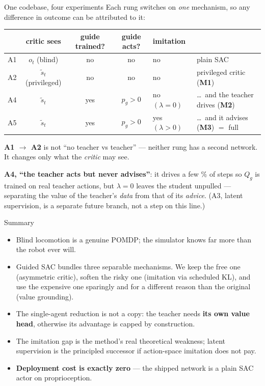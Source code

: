\documentclass[aspectratio=169]{beamer}
\newcommand{\ot}{o_t}
\newcommand{\st}{\tilde{s}_t}
\begin{document}
\begin{frame}{One codebase, four experiments}
  \relax
  {\footnotesize Each rung switches on \emph{one} mechanism, so any difference in outcome can be
  attributed to it:}
  \vspace{0.3em}
  \begin{center}\scriptsize
  \begin{tabular}{lcccll}
    \toprule
    & \textbf{critic sees} & \textbf{guide trained?} & \textbf{guide acts?} & \textbf{imitation} & \\
    \midrule
    A1 & $\ot$ (blind)      & no  & no        & no             & plain SAC \\
    A2 & $\st$ (privileged) & no  & no        & no             & privileged critic (\textbf{M1}) \\
    A4 & $\st$              & yes & $p_g > 0$ & no $(\lambda=0)$ & \ldots\ and the teacher drives (\textbf{M2}) \\
    A5 & $\st$              & yes & $p_g > 0$ & yes $(\lambda>0)$ & \ldots\ and it advises (\textbf{M3}) $=$ full \\
    \bottomrule
  \end{tabular}
  \end{center}
  \vspace{0.5em}
  {\footnotesize \textbf{A1 $\to$ A2} is not ``no teacher vs teacher'' --- neither rung has a
  second network. It changes only what the \emph{critic} may see.\par\vspace{0.3em}
  \textbf{A4, ``the teacher acts but never advises''}: it drives a few \% of steps so $Q_g$ is
  trained on real teacher actions, but $\lambda=0$ leaves the student unpulled --- separating the
  value of the teacher's \emph{data} from that of its \emph{advice}. (A3, latent supervision, is
  a separate future branch, not a step on this line.)}
\end{frame}

\begin{frame}{Summary}
  \begin{itemize}
    \item Blind locomotion is a genuine POMDP; the simulator knows far more than the robot
          ever will.
    \item Guided SAC bundles three separable mechanisms. We keep the free one (asymmetric
          critic), soften the risky one (imitation via scheduled KL), and use the expensive
          one sparingly and for a different reason than the original (value grounding).
    \item The single-agent reduction is not a copy: the teacher needs \textbf{its own value
          head}, otherwise its advantage is capped by construction.
    \item The imitation gap is the method's real theoretical weakness; latent supervision is
          the principled successor if action-space imitation does not pay.
    \item \textbf{Deployment cost is exactly zero} --- the shipped network is a plain SAC actor
          on proprioception.
  \end{itemize}
\end{frame}
\end{document}

